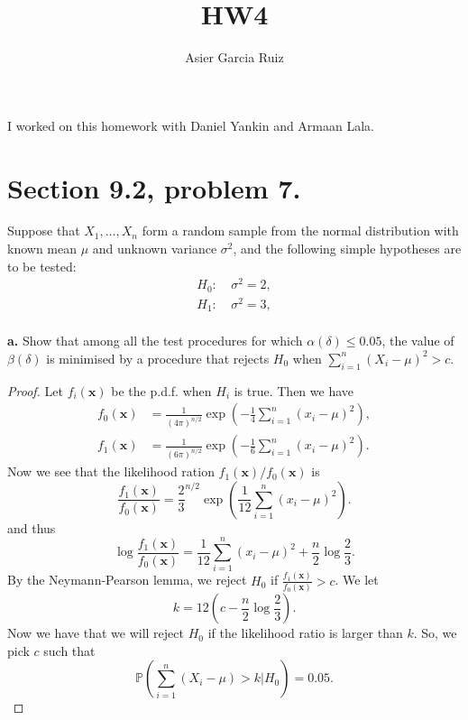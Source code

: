 \documentclass{article}
\title{HW4}
\author{Asier Garcia Ruiz}
\renewcommand{\P}[1]{\mathbb{P}\left(#1\right)}
\newcommand{\randsamp}{X_1,\dots,X_n}
\newcommand{\pdf}{p.d.f. }
\newenvironment{hwproof}[1]
{
    #1
    \begin{proof}
}{
    \end{proof}
}
\begin{document}
\maketitle
I worked on this homework with Daniel Yankin and Armaan Lala.

\section{Section 9.2, problem 7.}
\begin{hwproof}
    {Suppose that $\randsamp$ form a random sample from the normal distribution
        with known mean $\mu$ and unknown variance $\sigma^2$, and the following
        simple hypotheses are to be tested:
        \begin{align*}
            H_0: & \ \sigma^2 = 2, \\
            H_1: & \ \sigma^2 = 3, \\
        \end{align*}

        \textbf{a.} Show that among all the test procedures for which $\alpha(\delta) \leq 0.05$,
        the value of $\beta(\delta)$ is minimised by a procedure that rejects $H_0$ when
        $\sum_{i=1}^n (X_i - \mu)^2 > c$.
    }
    Let $f_i(\bm{x})$ be the \pdf when $H_i$ is true. Then we have
    \begin{align*}
        f_0(\bm{x}) & = \frac{1}{(4\pi)^{n/2}}\exp\left(-\frac{1}{4}\sum_{i=1}^n(x_i-\mu)^2\right), \\
        f_1(\bm{x}) & = \frac{1}{(6\pi)^{n/2}}\exp\left(-\frac{1}{6}\sum_{i=1}^n(x_i-\mu)^2\right).
    \end{align*}
    Now we see that the likelihood ration $f_1(\bm{x}) / f_0(\bm{x})$ is
    \begin{equation*}
        \frac{f_1(\bm{x})}{f_0(\bm{x})} =
        \frac{2}{3}^{n/2} \exp\left(\frac{1}{12}\sum_{i=1}^n(x_i - \mu)^2\right).
    \end{equation*}
    and thus
    \begin{equation*}
        \log\frac{f_1(\bm{x})}{f_0(\bm{x})} =
        \frac{1}{12}\sum_{i=1}^n(x_i - \mu)^2 + \frac{n}{2} \log\frac{2}{3}.
    \end{equation*}
    By the Neymann-Pearson lemma, we reject $H_0$ if $\frac{f_1(\bm{x})}{f_0(\bm{x})} > c$.
    We let
    \begin{equation*}
        k = 12(c - \frac{n}{2} \log\frac{2}{3}).
    \end{equation*}
    Now we have that we will reject $H_0$ if the likelihood ratio is larger than $k$. So,
    we pick $c$ such that
    \begin{equation*}
        \P{\sum_{i=1}^n(X_i - \mu) > k | H_0} = 0.05.
    \end{equation*}

\end{hwproof}
\end{document}
